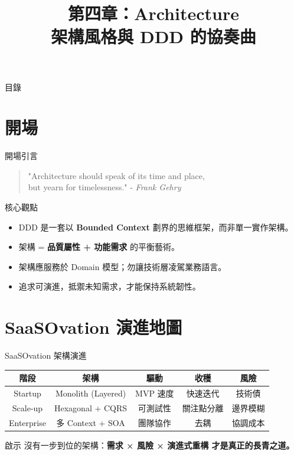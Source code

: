 \documentclass[UTF8]{beamer}
\title[第四章 · Architecture 與 DDD]{第四章：Architecture \\ 架構風格與 DDD 的協奏曲}
\date{}
\begin{document}
\begin{frame}
    \titlepage
\end{frame}

\begin{frame}{目錄}
    \scriptsize
    \tableofcontents[hideallsubsections]
\end{frame}


\section{開場}
\begin{frame}{開場引言}
    \begin{quote}
        \Large "Architecture should speak of its time and place,\\
        but yearn for timelessness."
        \small - \textit{Frank Gehry}
    \end{quote}
\end{frame}

\begin{frame}{核心觀點}
    \begin{itemize}
        \item DDD 是一套以 \textbf{Bounded Context} 劃界的思維框架，而非單一實作架構。
        \item 架構 = \textbf{品質屬性 + 功能需求} 的平衡藝術。
        \item 架構應服務於 Domain 模型；勿讓技術層凌駕業務語言。
        \item 追求可演進，抵禦未知需求，才能保持系統韌性。
    \end{itemize}
\end{frame}

\section{SaaSOvation 演進地圖}
\begin{frame}{SaaSOvation 架構演進}
    \scriptsize
    \begin{tabular}{|c|c|c|c|c|}
        \hline
        階段       & 架構               & 驅動     & 收穫       & 風險     \\ \hline\hline
        Startup    & Monolith (Layered) & MVP 速度 & 快速迭代   & 技術債   \\ \hline
        Scale-up   & Hexagonal + CQRS   & 可測試性 & 關注點分離 & 邊界模糊 \\ \hline
        Enterprise & 多 Context + SOA   & 團隊協作 & 去耦       & 協調成本 \\ \hline
    \end{tabular}
    \vspace{0.3cm}
    \begin{block}{啟示}
        沒有一步到位的架構：\bfseries{需求 × 風險 × 演進式重構} 才是真正的長青之道。
    \end{block}
\end{frame}
\end{document}
